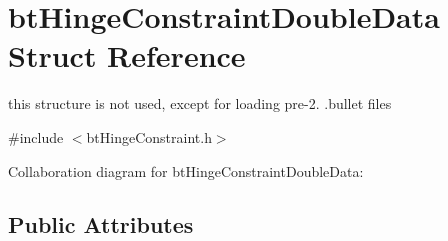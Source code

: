 \hypertarget{structbt_hinge_constraint_double_data}{\section{bt\+Hinge\+Constraint\+Double\+Data Struct Reference}
\label{structbt_hinge_constraint_double_data}
}


this structure is not used, except for loading pre-\/2. .bullet files  




{\ttfamily \#include $<$bt\+Hinge\+Constraint.\+h$>$}



Collaboration diagram for bt\+Hinge\+Constraint\+Double\+Data\+:
\subsection*{Public Attributes}
